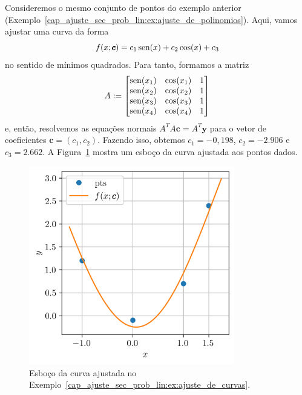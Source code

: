 \begin{ex}\label{cap_ajuste_sec_prob_lin:ex:ajuste_de_curvas}
  Consideremos o mesmo conjunto de pontos do exemplo anterior (Exemplo~\ref{cap_ajuste_sec_prob_lin:ex:ajuste_de_polinomios}). Aqui, vamos ajustar uma curva da forma
  \begin{equation}
    f(x; \pmb{c}) = c_1\operatorname{sen}(x) + c_2\cos(x) + c_3
  \end{equation}
no sentido de mínimos quadrados. Para tanto, formamos a matriz
\begin{equation}
  A :=
  \begin{bmatrix}
    \operatorname{sen}(x_1) & \cos(x_1) & 1 \\
    \operatorname{sen}(x_2) & \cos(x_2) & 1 \\
    \operatorname{sen}(x_3) & \cos(x_3) & 1 \\
    \operatorname{sen}(x_4) & \cos(x_4) & 1
  \end{bmatrix}
\end{equation}
  e, então, resolvemos as equações normais $A^TA\pmb{c} = A^T\pmb{y}$ para o vetor de coeficientes $\pmb{c} = (c_1, c_2)$. Fazendo isso, obtemos $c_1=-0,198$, $c_2=-2.906$ e $c_3=2.662$. A Figura~\ref{cap_ajuste_sec_prob_lin:fig:ex_ajuste_de_curvas} mostra um esboço da curva ajustada aos pontos dados.

  \begin{figure}[h]
    \centering
    \includegraphics[width=0.8\textwidth]{cap_ajuste/dados/fig_mqCurva/fig}
    \caption{Esboço da curva ajustada no Exemplo~\ref{cap_ajuste_sec_prob_lin:ex:ajuste_de_curvas}.}
    \label{cap_ajuste_sec_prob_lin:fig:ex_ajuste_de_curvas}
  \end{figure}


\end{ex}
